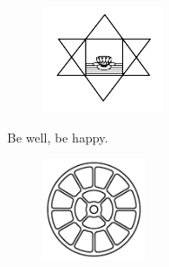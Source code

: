\documentclass[12pt]{extarticle}
\newcommand\AtPageUpperRight[1]{\AtPageUpperLeft{%
 \put(\LenToUnit{\paperwidth},\LenToUnit{0\paperheight}){#1}%
 }}%
\newcommand\AtPageLowerRight[1]{\AtPageLowerLeft{%
 \put(\LenToUnit{\paperwidth},\LenToUnit{0\paperheight}){#1}%
 }}%
\begin{document}
\vspace{1.5cm}

\begin{center}
\leafline
\end{center}


\newpage
{}
\vspace*{\fill}

\begin{figure}[h!]
\centering
\includegraphics[width=3.5cm]{aurobindo.png}
\end{figure}

\vspace*{\fill}

\begin{figure}[h!]
\centering
{}
\end{figure}

\begin{center}
\huge{Be well, be happy.}
\end{center}

\vspace*{\fill}

\begin{figure}[h!]
\centering
\includegraphics[width=3cm]{mother.png}
\end{figure}



\vspace*{\fill}
\end{document}

